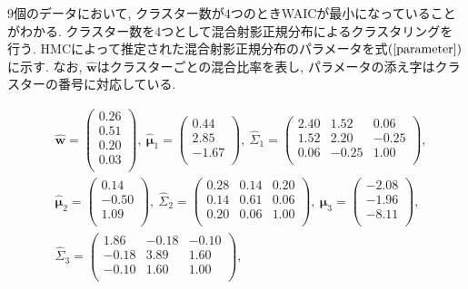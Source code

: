 \documentclass[a4paper,11pt]{jarticle}
\begin{document}
\noindent
$9$個のデータにおいて, クラスター数が$4$つのときWAICが最小になっていることがわかる. クラスター数を$4$つとして混合射影正規分布によるクラスタリングを行う. HMCによって推定された混合射影正規分布のパラメータを式$(\ref{parameter})$に示す. なお, $\hat {\bm w}$はクラスターごとの混合比率を表し, パラメータの添え字はクラスターの番号に対応している.

\begin{equation}
\label{parameter}
\begin{split}
&\hat {\bm w} = \begin{pmatrix} 0.26 \\ 0.51 \\ 0.20 \\ 0.03 \\ \end{pmatrix},\ 
\hat{\bm \mu}_1 = \begin{pmatrix} 0.44 \\ 2.85 \\ -1.67 \\ \end{pmatrix},\ 
\hat \Sigma_1 = \begin{pmatrix}  2.40 & 1.52 &  0.06 \\ 1.52 & 2.20 & -0.25 \\ 0.06 & -0.25 &1.00 \\ \end{pmatrix},\\ 
&\hat{\bm \mu}_2 = \begin{pmatrix} 0.14 \\ -0.50 \\ 1.09 \\ \end{pmatrix},\ 
\hat \Sigma_2 = \begin{pmatrix}   0.28  & 0.14 &  0.20 \\ 0.14 & 0.61 & 0.06 \\  0.20 & 0.06 &1.00 \\ \end{pmatrix},\ 
\hat{\bm \mu}_3 = \begin{pmatrix} -2.08  \\ -1.96 \\ -8.11 \\ \end{pmatrix},\\ 
&\hat \Sigma_3 = \begin{pmatrix}  1.86  & -0.18 &  -0.10 \\-0.18 & 3.89 & 1.60 \\  -0.10 & 1.60 & 1.00 \\ \end{pmatrix},\ 

\end{split}
\end{equation}
\end{document}
